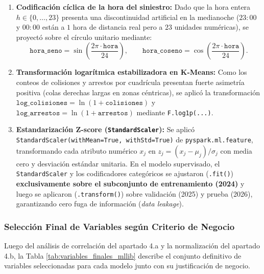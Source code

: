 \documentclass[11pt,a4paper]{article}
\begin{document}
\begin{enumerate}
    \item \textbf{Codificación cíclica de la hora del siniestro:} Dado que la hora entera $h \in \{0, \dots, 23\}$ presenta una discontinuidad artificial en la medianoche ($23:00$ y $00:00$ están a $1$ hora de distancia real pero a $23$ unidades numéricas), se proyectó sobre el círculo unitario mediante:
    \[
    \texttt{hora\_seno} = \sin\!\left(\frac{2\pi \cdot \texttt{hora}}{24}\right), \qquad
    \texttt{hora\_coseno} = \cos\!\left(\frac{2\pi \cdot \texttt{hora}}{24}\right).
    \]
    \item \textbf{Transformación logarítmica estabilizadora en K-Means:} Como los conteos de colisiones y arrestos por cuadrícula presentan fuerte asimetría positiva (colas derechas largas en zonas céntricas), se aplicó la transformación $\texttt{log\_colisiones} = \ln(1 + \texttt{colisiones})$ y $\texttt{log\_arrestos} = \ln(1 + \texttt{arrestos})$ mediante \texttt{F.log1p(...)}.
    \item \textbf{Estandarización Z-score (\texttt{StandardScaler}):} Se aplicó \texttt{StandardScaler(withMean=True, withStd=True)} de \texttt{pyspark.ml.feature}, transformando cada atributo numérico $x_j$ en $z_j = (x_j - \mu_j)/\sigma_j$ con media cero y desviación estándar unitaria. En el modelo supervisado, el \texttt{StandardScaler} y los codificadores categóricos se ajustaron (\texttt{.fit()}) \textbf{exclusivamente sobre el subconjunto de entrenamiento (2024)} y luego se aplicaron (\texttt{.transform()}) sobre validación (2025) y prueba (2026), garantizando cero fuga de información (\textit{data leakage}).
\end{enumerate}

\subsubsection{Selección Final de Variables según Criterio de Negocio}
\label{subsubsec:num4c_seleccion_negocio}

Luego del análisis de correlación del apartado 4.a y la normalización del apartado 4.b, la Tabla \ref{tab:variables_finales_mllib} describe el conjunto definitivo de variables seleccionadas para cada modelo junto con su justificación de negocio.
\end{document}
